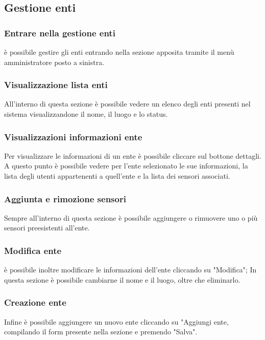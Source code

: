 \subsection{Gestione enti}
	
	\subsubsection{Entrare nella gestione enti}
		è possibile gestire gli enti entrando nella sezione apposita tramite il menù amministratore posto a sinistra.

	\subsubsection{Visualizzazione lista enti}
		All'interno di questa sezione è possibile vedere un elenco degli enti presenti nel sistema visualizzandone il nome, il luogo e lo status.			

	\subsubsection{Visualizzazioni informazioni ente}
		Per visualizzare le informazioni di un ente è possibile cliccare sul bottone dettagli. A questo punto è possibile vedere per l'ente selezionato le sue informazioni, la lista degli utenti appartenenti a quell'ente e la lista dei sensori associati.

	\subsubsection{Aggiunta e rimozione sensori}
		Sempre all'interno di questa sezione è possibile aggiungere o rimuovere uno o più sensori preesistenti all'ente. 

	\subsubsection{Modifica ente}	
		è possibile inoltre modificare le informazioni dell'ente cliccando su "Modifica"; In questa sezione è possibile cambiarne il nome e il luogo, oltre che eliminarlo.

	\subsubsection{Creazione ente}
		Infine è possibile aggiungere un nuovo ente cliccando su "Aggiungi ente, compilando il form presente nella sezione e premendo "Salva".

